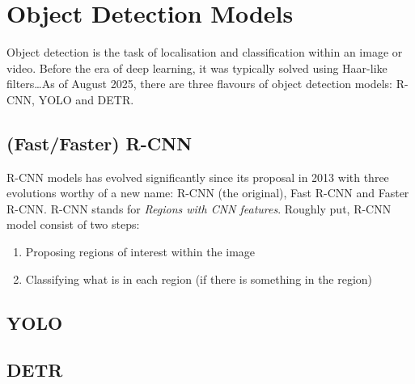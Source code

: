 \documentclass[11pt]{article}
\begin{document}
\section{Object Detection Models}

Object detection is the task of localisation and classification within an image or video. Before the era of deep learning, it was typically solved using Haar-like filters\dots As of August 2025, there are three flavours of object detection models: R-CNN, YOLO and DETR.

\subsection{\TODO{: }(Fast/Faster) R-CNN}
R-CNN models has evolved significantly since its proposal in 2013 with three evolutions worthy of a new name: R-CNN (the original), Fast R-CNN and Faster R-CNN. R-CNN stands for \textit{Regions with CNN features}. Roughly put, R-CNN model consist of two steps:
\begin{enumerate}
    \item Proposing regions of interest within the image
    \item Classifying what is in each region (if there is something in the region)
\end{enumerate}

\subsection{YOLO}

\subsection{DETR}



\end{document}

